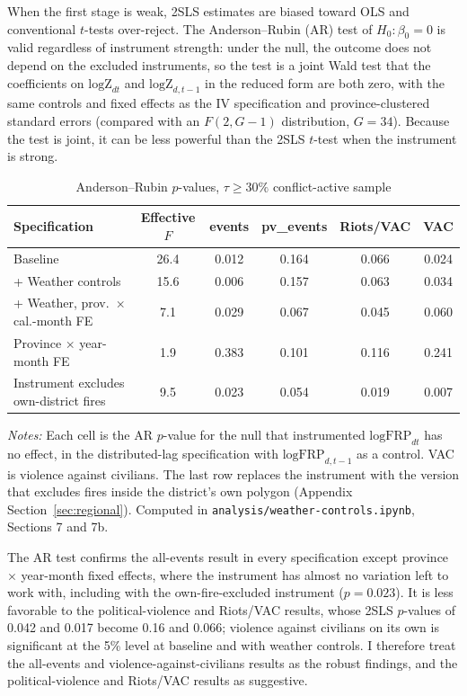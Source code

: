 \documentclass[12pt]{article}
\begin{document}
When the first stage is weak, 2SLS estimates are biased toward OLS and conventional $t$-tests over-reject. The Anderson--Rubin (AR) test of $H_0\!: \beta_0 = 0$ is valid regardless of instrument strength: under the null, the outcome does not depend on the excluded instruments, so the test is a joint Wald test that the coefficients on $\text{logZ}_{dt}$ and $\text{logZ}_{d,t-1}$ in the reduced form are both zero, with the same controls and fixed effects as the IV specification and province-clustered standard errors (compared with an $F(2, G-1)$ distribution, $G = 34$). Because the test is joint, it can be less powerful than the 2SLS $t$-test when the instrument is strong.

\begin{table}[H]
\centering
\caption{Anderson--Rubin $p$-values, $\tau \geq 30\%$ conflict-active sample}
\label{tab:ar}
\begin{tabular}{lccccc}
\toprule
Specification & Effective $F$ & events & pv\_events & Riots/VAC & VAC \\
\midrule
Baseline                                         & 26.4 & 0.012 & 0.164 & 0.066 & 0.024 \\
+ Weather controls                               & 15.6 & 0.006 & 0.157 & 0.063 & 0.034 \\
+ Weather, prov.\ $\times$ cal.-month FE         & 7.1  & 0.029 & 0.067 & 0.045 & 0.060 \\
Province $\times$ year-month FE                  & 1.9  & 0.383 & 0.101 & 0.116 & 0.241 \\
Instrument excludes own-district fires           & 9.5  & 0.023 & 0.054 & 0.019 & 0.007 \\
\bottomrule
\end{tabular}
\begin{minipage}{0.9\textwidth}
\vspace{4pt}
\footnotesize \emph{Notes:} Each cell is the AR $p$-value for the null that instrumented $\text{logFRP}_{dt}$ has no effect, in the distributed-lag specification with $\text{logFRP}_{d,t-1}$ as a control. VAC is violence against civilians. The last row replaces the instrument with the version that excludes fires inside the district's own polygon (Appendix Section~\ref{sec:regional}). Computed in \texttt{analysis/weather-controls.ipynb}, Sections 7 and 7b.
\end{minipage}
\end{table}

The AR test confirms the all-events result in every specification except province $\times$ year-month fixed effects, where the instrument has almost no variation left to work with, including with the own-fire-excluded instrument ($p=0.023$). It is less favorable to the political-violence and Riots/VAC results, whose 2SLS $p$-values of 0.042 and 0.017 become 0.16 and 0.066; violence against civilians on its own is significant at the 5\% level at baseline and with weather controls. I therefore treat the all-events and violence-against-civilians results as the robust findings, and the political-violence and Riots/VAC results as suggestive.



\end{document}
